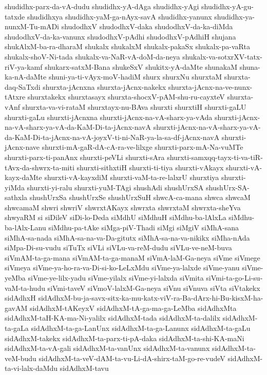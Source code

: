 {shudidhx-parx-da-vA-dudu
shudidhx-yA-dAga
shudidhx-yAgi
shudidhx-yA-gu-tatxde
shudidhxya
shudidhx-yaM-ga-nAyx-savA
shudidhx-yanunx
shudidhx-ya-nunxM-Tu-mADi
shudodhxV
shudodhxV-daka
shudodhxV-da-ka-diMda
shudodhxV-da-ka-vanunx
shudodhxV-pAdhi
shudodhxV-pAdhiH
shujana
shukAlxM-ba-ra-dharaM
shukalx
shukalxM
shukalx-pakaSx
shukalx-pa-vaRta
shukalx-shoV-Ni-tada
shukalx-va-NaR-vA-doM-da-neya
shukalx-va-sotxrXV-tatx-riV-ya-kamf
shukarx-satxM-Bana
shukeSxV
shukitx-yA-daMte
shunakaM
shuna-ka-nA-daMte
shuni-ya-ti-vAyx-moV-hadiM
shurx
shurxNu
shurxtaM
shurxta-daq-SaTxdi
shurxta-jAcnxna
shurxta-jAcnx-nakekx
shurxta-jAcnx-na-ve-nunx-tAtxre
shurxtakekx
shurxtasayx
shurxta-shocxV-pAM-shu-ru-cayxteV
shurxta-vAnf
shurxta-va-vi-rataM
shurxtayx-nu-BAva
shurxti
shurxtiH
shurxti-gaLU
shurxti-gaLu
shurxti-jAcnxna
shurxti-jAcnx-na-vA-sharx-ya-vAda
shurxti-jAcnx-na-vA-sharx-ya-vA-da-KaM-Di-ta-jAcnx-navA
shurxti-jAcnx-na-vA-sharx-ya-vA-da-KaM-Di-ta-jAcnx-na-vA-joyxV-ti-ni-NaR-ya-la-sa-df-jAcnx-navA
shurxti-jAcnx-nave
shurxti-mA-gaR-dA-cA-ra-ve-lilxge
shurxti-parx-mA-Na-vuMTe
shurxti-parx-ti-panAnx
shurxti-peVLi
shurxti-sAra
shurxti-samxqq-tayx-ti-va-tiR-tAvx-da-shwrx-ta-miti
shurxti-sithxtiH
shurxti-ti-tiya
shurxti-vAkayx
shurxti-vA-kayx-daMte
shurxti-vA-kayxdiM
shurxti-vaM-ta-re-lalxrU
shurxtiya
shurxti-yiMda
shurxti-yi-ralu
shurxti-yuM-TAgi
shushAdi
shushUrxSA
shushUrx-SA-sathxla
shushUrxSa
shushUrxSe
shushUrxSuH
shwcA-ca-mana
shwca
shwcaM
shwcamaM
shwri
shwriV
shwrxtAKayx
shwrxta
shwrxtaM
shwrxta-sheYva
shwyaRM
si
siDileV
siDi-lo-Deda
siMdhU
siMdhuH
siMdhu-ba-lAlxLa
siMdhu-ba-lAlx-Lanu
siMdhu-pa-tAke
siMga-piV-Thadi
siMgi
siMgiV
siMhA-sana
siMhA-sa-nada
siMhA-sa-na-va-Da-gitutx
siMhA-sa-na-va-nikikx
siMha-nAda
siMpa-Di-su-vudu
siTuTx
siVLi
siVLu-va-reM-dudu
siVLu-ve-neM-buva
siVmAM-ta-ga-mana
siVmAM-ta-ga-manaM
siVmA-laM-Ga-neya
siVme
siVmege
siVmeya
siVme-ya-ho-ra-va-Di-si-ko-LeLxMdu
siVme-ya-lalxde
siVme-yanu
siVme-yeMba
siVme-ye-lilx-yadu
siVme-yilalx
siVme-yi-lalxda
siVmita
siVmi-ta-go-Li-su-vaM-ta-hudu
siVmi-taveV
siVmoV-lalxM-Ga-neya
siVnu
siVnuva
siVta
siVtakekx
sidAdhxH
sidAdhxM-bu-ja-savx-sitx-ka-mu-katx-viV-ra-Ba-dArx-hi-Bu-kisxM-ha-gavAM
sidAdhxM-tAKeyxV
sidAdhxM-tA-ga-ma-ga-LeMba
sidAdhxMta
sidAdhxM-taH-KA-ma-Ni-yalilx
sidAdhxM-tada
sidAdhxM-ta-dalilx
sidAdhxM-ta-gaLa
sidAdhxM-ta-ga-LanUnx
sidAdhxM-ta-ga-Lanunx
sidAdhxM-ta-gaLu
sidAdhxM-takekx
sidAdhxM-ta-parx-ti-pA-daka
sidAdhxM-ta-shi-KA-maNi
sidAdhxM-ta-vA-gali
sidAdhxM-ta-vanUnx
sidAdhxM-ta-vanunx
sidAdhxM-ta-veM-budu
sidAdhxM-ta-veV-dAM-ta-vu-Li-dA-shirx-taM-go-re-vudeV
sidAdhxM-ta-vi-lalx-daMdu
sidAdhxM-tavu
}
